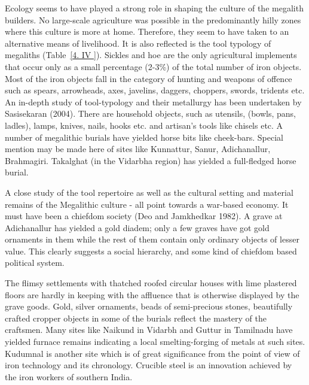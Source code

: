 Ecology seems to have played a strong role in shaping the culture of the megalith builders. No large-scale agriculture was possible in the predominantly hilly zones where this culture is more at home. Therefore, they seem to have taken to an alternative means of livelihood. It is also reflected is the tool typology of megaliths (Table~\ref{4. IV	}). Sickles and hoe are the only agricultural implements that occur only as a small percentage (2-3\%) of the total number of iron objects. Most of the iron objects fall in the category of hunting and weapons of offence such as spears, arrowheads, axes, javelins, daggers, choppers, swords, tridents etc. An in-depth study of tool-typology and their metallurgy has been undertaken by Sasisekaran (2004).  There are household objects, such as utensils, (bowls, pans, ladles), lamps, knives, nails, hooks etc. and artisan's tools like chisels etc. A number of megalithic burials have yielded horse bits like cheek-bars. Special mention may be made here of sites like Kunnattur, Sanur, Adichanallur, Brahmagiri. Takalghat (in the Vidarbha region) has yielded a full-fledged horse burial.

A close study of the tool repertoire as well as the cultural setting and material remains of the Megalithic culture - all point towards a war-based economy. It must have been a chiefdom society (Deo and Jamkhedkar 1982). A grave at Adichanallur has yielded a gold diadem; only a few graves have got gold ornaments in them while the rest of them contain only ordinary objects of lesser value. This clearly suggests a social hierarchy, and some kind of chiefdom based political system.

The flimsy settlements with thatched roofed circular houses with lime plastered floors are hardly in keeping with the affluence that is otherwise displayed by the grave goods. Gold, silver ornaments, beads of semi-precious stones, beautifully crafted cropper objects in some of the burials reflect the mastery of the craftsmen. Many sites like Naikund in Vidarbh and Guttur in Tamilnadu have yielded furnace remains indicating a local smelting-forging of metals at such sites. Kudumnal is another site which is of great significance from the point of view of iron technology and its chronology. Crucible steel is an innovation achieved by the iron workers of southern India. 

